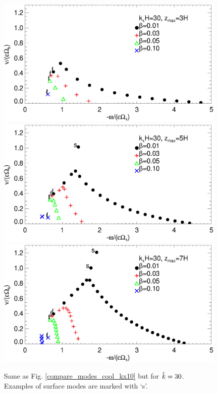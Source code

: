 \begin{figure}
  \includegraphics[width=\linewidth,clip=true,trim=0cm 1.75cm 0cm
  0cm]{figures/compare_modes_cool_kx30_z3.ps} 
  \includegraphics[width=\linewidth,clip=true,trim=0cm 1.75cm 0cm
  0cm]{figures/compare_modes_cool_kx30_z5.ps}
  \includegraphics[width=\linewidth]{figures/compare_modes_cool_kx30_z7.ps}
  \caption{Same as Fig. \ref{compare_modes_cool_kx10} but for
    $\hat{k}=30$. Examples of surface modes are marked with `s'. 
    \label{compare_modes_cool_kx30} 
  }
\end{figure}

